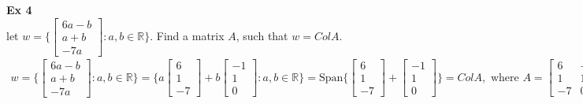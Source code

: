 \documentclass{article}
\begin{document}
   \textbf{Ex 4}\\
   let $ w = \{ \begin{bmatrix}
       6a-b\\
       a+b\\
       -7a
   \end{bmatrix} : a,b \in \mathbb{R} \} $. Find a matrix $ A $, such that $ w= ColA $.
   \[
       \begin{gathered}
       w = \{ \begin{bmatrix}
           6a-b\\
           a+b\\
           -7a
       \end{bmatrix} :a,b \in \mathbb{R}\} = 
       \{ a\begin{bmatrix}
           6\\
           1\\
           -7
       \end{bmatrix} + b\begin{bmatrix}
           -1\\
           1\\
           0
       \end{bmatrix}: a,b \in \mathbb{R}\} = 
       \text{Span} \{ \begin{bmatrix}
           6\\
           1\\
           -7
       \end{bmatrix} + \begin{bmatrix}
           -1\\
           1\\
           0
       \end{bmatrix}\} = ColA, \text{ where }A=
       \begin{bmatrix}
           6 &-1\\
           1 &1\\
           -7 &0
       \end{bmatrix}
       \end{gathered}
   \]
\end{document}
